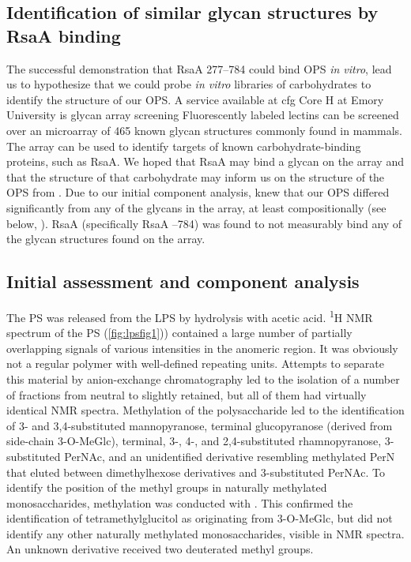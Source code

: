 \subsection{Identification of similar glycan structures by RsaA binding} \label{sec:ident-simil-glyc}
  
The successful demonstration that RsaA \del{}277--784 could bind \caulobacter{} \ac{OPS} \textit{in vitro}, lead us to hypothesize that we could probe \textit{in vitro} libraries of carbohydrates to identify the structure of our \ac{OPS}. A service available at \ac{cfg} Core H at Emory University is glycan array screening Fluorescently labeled lectins can be screened over an microarray of 465 known glycan structures commonly found in mammals. The array can be used to identify targets of known carbohydrate-binding proteins, such as RsaA. We hoped that RsaA may bind a glycan on the array and that the structure of that carbohydrate may inform us on the structure of the \ac{OPS} from \caulobacter. Due to our initial component analysis, knew that our \ac{OPS} differed significantly from any of the glycans in the array, at least compositionally (see below, ). RsaA (specifically RsaA --784) was found to not measurably bind any of the glycan structures found on the array. 

\subsection{Initial assessment and component analysis} %
\label{sub:initial_assessment_and_component_analysis}

The \ac{PS} was released from the \ac{LPS} by hydrolysis with acetic acid. \textsuperscript{1}H
\ac{NMR} spectrum of the \ac{PS} (\cref{fig:lpsfig1})) contained a large number of partially
overlapping signals of various intensities in the anomeric region. It was obviously not a regular
polymer with well-defined repeating units. Attempts to separate this material by anion-exchange
chromatography led to the isolation of a number of fractions from neutral to slightly retained,
but all of them had virtually identical \ac{NMR} spectra. Methylation of the polysaccharide led to
the identification of 3- and 3,4-substituted mannopyranose, terminal glucopyranose (derived from
side-chain 3-O-MeGlc), terminal, 3-, 4-, and 2,4-substituted rhamnopyranose, 3-substituted PerNAc,
and an unidentified derivative resembling methylated PerN that eluted between dimethylhexose
derivatives and 3-substituted PerNAc. To identify the position of the methyl groups in naturally
methylated monosaccharides, methylation was conducted with . This confirmed the
identification of tetramethylglucitol as originating from 3-O-MeGlc, but did not identify any
other naturally methylated monosaccharides, visible in \ac{NMR} spectra. An unknown derivative
received two deuterated methyl groups.

